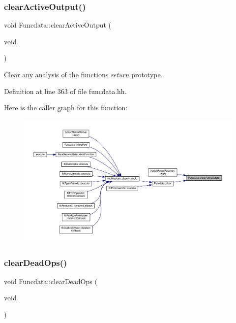 \mbox{\label{class_funcdata_a8f29c20e2a01d0cbf600b613e929e88c}} 
\subsubsection{\texorpdfstring{clearActiveOutput()}{clearActiveOutput()}}
{\footnotesize\ttfamily void Funcdata\+::clear\+Active\+Output (\begin{DoxyParamCaption}\item[{void}]{ }\end{DoxyParamCaption})\hspace{0.3cm}{\ttfamily [inline]}}



Clear any analysis of the function\textquotesingle{}s {\itshape return} prototype. 



Definition at line 363 of file funcdata.\+hh.

Here is the caller graph for this function\+:
\nopagebreak
\begin{figure}[H]
\begin{center}
\leavevmode
\includegraphics[width=350pt]{class_funcdata_a8f29c20e2a01d0cbf600b613e929e88c_icgraph}
\end{center}
\end{figure}
\mbox{\label{class_funcdata_adbb872f99bf69e4101034da41cdebd84}} 
\subsubsection{\texorpdfstring{clearDeadOps()}{clearDeadOps()}}
{\footnotesize\ttfamily void Funcdata\+::clear\+Dead\+Ops (\begin{DoxyParamCaption}\item[{void}]{ }\end{DoxyParamCaption})\hspace{0.3cm}{\ttfamily [inline]}}



